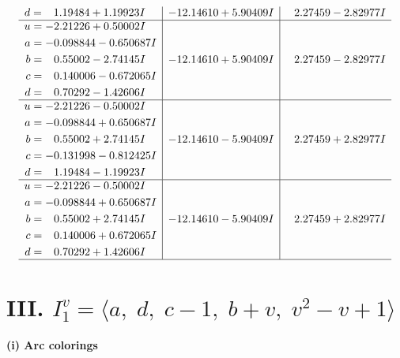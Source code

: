 \documentclass[1p]{elsarticle_modified}
\theoremstyle{definition}
\begin{document}
$$\begin{array}{c|c|c}
\begin{aligned}
d &= \phantom{-}1.19484 + 1.19923 I\end{aligned}
 & -12.14610 + 5.90409 I & \phantom{-}2.27459 - 2.82977 I \\ \hline\begin{aligned}
u &= -2.21226 + 0.50002 I \\
a &= -0.098844 - 0.650687 I \\
b &= \phantom{-}0.55002 - 2.74145 I \\
c &= \phantom{-}0.140006 - 0.672065 I \\
d &= \phantom{-}0.70292 - 1.42606 I\end{aligned}
 & -12.14610 + 5.90409 I & \phantom{-}2.27459 - 2.82977 I \\ \hline\begin{aligned}
u &= -2.21226 - 0.50002 I \\
a &= -0.098844 + 0.650687 I \\
b &= \phantom{-}0.55002 + 2.74145 I \\
c &= -0.131998 - 0.812425 I \\
d &= \phantom{-}1.19484 - 1.19923 I\end{aligned}
 & -12.14610 - 5.90409 I & \phantom{-}2.27459 + 2.82977 I \\ \hline\begin{aligned}
u &= -2.21226 - 0.50002 I \\
a &= -0.098844 + 0.650687 I \\
b &= \phantom{-}0.55002 + 2.74145 I \\
c &= \phantom{-}0.140006 + 0.672065 I \\
d &= \phantom{-}0.70292 + 1.42606 I\end{aligned}
 & -12.14610 - 5.90409 I & \phantom{-}2.27459 + 2.82977 I\\
 \hline 
 \end{array}$$\newpage\newpage\renewcommand{\arraystretch}{1}
\centering \section*{III. $I^v_{1}= \langle a,\;d,\;c-1,\;b+v,\;v^2- v+1 \rangle$}
\flushleft \textbf{(i) Arc colorings}\\
\end{document}
